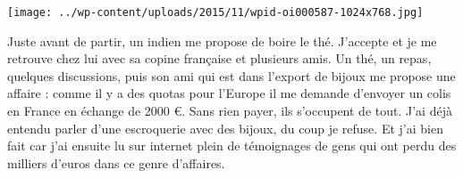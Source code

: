  \newline
 \newline
\centerline{\texttt{[image: ../wp-content/uploads/2015/11/wpid-oi000587-1024x768.jpg]} } 
 \newline
 Juste avant de partir, un indien me propose de boire le thé. J'accepte et je me retrouve chez lui avec sa copine française et plusieurs amis. Un thé, un repas, quelques discussions, puis son ami qui est dans l'export de bijoux me propose une affaire : comme il y a des quotas pour l'Europe il me demande d'envoyer un colis en France en échange de 2000 €. Sans rien payer, ils s'occupent de tout. \newline
 J'ai déjà entendu parler d'une escroquerie avec des bijoux, du coup je refuse. \newline
 Et j'ai bien fait car j'ai ensuite lu sur internet plein de témoignages de gens qui ont perdu des milliers d'euros dans ce genre d'affaires. \newline

\newpage
 
